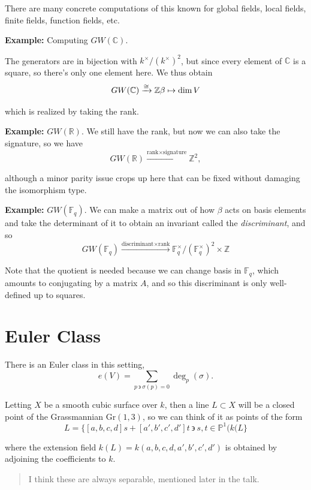 \documentclass[11pt]{scrreprt}
\theoremstyle{definition}
\newcommand{\RR}[0]{{\mathbb{R}}}
\newcommand{\ZZ}[0]{{\mathbb{Z}}}
\newcommand{\CC}[0]{{\mathbb{C}}}
\newcommand{\FF}[0]{{\mathbb{F}}}
\newcommand{\PP}[0]{{\mathbb{P}}}
\newcommand{\Gr}[0]{{\text{Gr}}}
\newcommand{\suchthat}[0]{{~\backepsilon ~}}
\newcommand{\mapsvia}[1]{\xrightarrow{#1}}
\newcommand{\theset}[1]{\{{#1}\}}
\begin{document}
There are many concrete computations of this known for global fields,
local fields, finite fields, function fields, etc.

\textbf{Example:} Computing \(GW(\CC)\).

The generators are in bijection with \(k^\times/(k^\times)^2\), but
since every element of \(\CC\) is a square, so there's only one element
here. We thus obtain \[
GW(\CC) \mapsvia{\cong} \ZZ \\
\beta \mapsto \dim V
\]

which is realized by taking the rank.

\textbf{Example:} \(GW(\RR)\). We still have the rank, but now we can
also take the signature, so we have \[
GW(\RR) \mapsvia{\text{rank} \times \text{signature}} \ZZ^2,
\]

although a minor parity issue crops up here that can be fixed without
damaging the isomorphism type.

\textbf{Example:} \(GW(\FF_q)\). We can make a matrix out of how
\(\beta\) acts on basis elements and take the determinant of it to
obtain an invariant called the \emph{discriminant}, and so \[
GW(\FF_q) \mapsvia{\text{discriminant} \times \text{rank}} \FF_q^\times/(\FF_q^\times)^2 \times \ZZ
\]

Note that the quotient is needed because we can change basis in
\(\FF_q\), which amounts to conjugating by a matrix \(A\), and so this
discriminant is only well-defined up to squares.

\hypertarget{euler-class}{%
\section{Euler Class}\label{euler-class}}

There is an Euler class in this setting, \[
e(V) = \sum_{p\suchthat \sigma(p) = 0} \deg_p(\sigma).
\]

Letting \(X\) be a smooth cubic surface over \(k\), then a line
\(L\subset X\) will be a closed point of the Grassmannian \(\Gr(1,3)\),
so we can think of it as points of the form \[
L = \theset{[a,b,c,d]s + [a',b',c',d']t \suchthat s,t \in \PP^1(k(L}
\]

where the extension field \(k(L) = k(a,b,c,d,a',b',c',d')\) is obtained
by adjoining the coefficients to \(k\).

\begin{quote}
I think these are always separable, mentioned later in the talk.
\end{quote}
\end{document}
